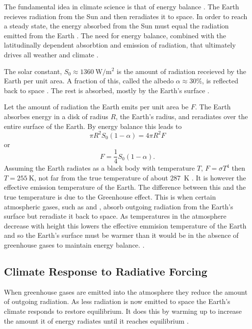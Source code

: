 The fundamental idea in climate science is that of energy balance \parencite{North1981}. The Earth recieves radiation from the Sun and then reradiates it to space.
In order to reach a steady state, the energy absorbed from the Sun must equal the radiation emitted from the Earth \parencite{Peixoto1992}. The need for energy balance, combined with the
latitudinally dependent absorbtion and emission of radiation, that ultimately drives all weather and climate \parencite{Lorenz1967}.

The solar constant, $S_0 \approx \SI{1360}{\watt\per\meter\squared}$ \parencite{Johnson1954} is the amount of radiation receieved by the Earth per unit area.  A fraction of this,
called the albedo $\alpha \approx 30\%$, is reflected back to space \parencite{Goode2021}. The rest is absorbed, mostly by the Earth's surface \parencite{Trenberth2009}.

Let the amount of radiation the Earth emits per unit area be $F$. The Earth absorbes energy in a disk of radius $R$, the Earth's radius, and reradiates
over the entire surface of the Earth. By energy balance this leads to
\begin{equation}
  \pi R^2 S_0 (1-\alpha) = 4 \pi R^2 F
\end{equation}
or
\begin{equation}
  \label{eq:energy_balance}
  F = \frac{1}{4} S_0 \left(1 - \alpha\right).
\end{equation}
Assuming the Earth radiates as a black body with temperature $T$, $F = \sigma T^4$ then $T = \SI{255}{\kelvin}$, not far from the true temperature of about \SI{287}{\kelvin} \parencite{Jones1999}.
It is however the effective emission temperature of the Earth. The difference between this and the true temperature is due to the Greenhouse effect. This is when certain atmospheric gases,
such as  and , absorb outgoing radiation from the Earth's surface
but reradiate it back to space. As temperatures in the atmosphere decrease with height this lowers the effective emmision temperature of the Earth and so the Earth's surface must be
warmer than it would be in the absence of greenhouse gases to maintain energy balance. \parencite{Pierrehumbert2010}.

\subsection{Climate Response to Radiative Forcing}
When greenhouse gases are emitted into the atmosphere they reduce the amount of outgoing radiation. As less radiation is now
emitted to space the Earth's climate responds to restore equilibrium. It does this by warming up to increase the amount it of energy
radiates until it reaches equilibrium \parencite{Manabe1967,Pierrehumbert2010}. 

